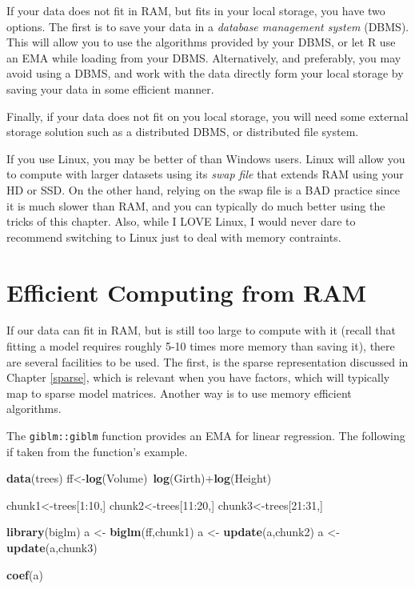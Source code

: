 \documentclass[]{book}
\newenvironment{Shaded}{\begin{snugshade}}{\end{snugshade}}
\newcommand{\KeywordTok}[1]{\textcolor[rgb]{0.13,0.29,0.53}{\textbf{{#1}}}}
\newcommand{\DecValTok}[1]{\textcolor[rgb]{0.00,0.00,0.81}{{#1}}}
\newcommand{\StringTok}[1]{\textcolor[rgb]{0.31,0.60,0.02}{{#1}}}
\newcommand{\NormalTok}[1]{{#1}}
\theoremstyle{definition}
\theoremstyle{definition}
\theoremstyle{remark}
\let\BeginKnitrBlock\begin \let\EndKnitrBlock\end
\begin{document}
If your data does not fit in RAM, but fits in your local storage, you
have two options. The first is to save your data in a \emph{database
management system} (DBMS). This will allow you to use the algorithms
provided by your DBMS, or let R use an EMA while loading from your DBMS.
Alternatively, and preferably, you may avoid using a DBMS, and work with
the data directly form your local storage by saving your data in some
efficient manner.

Finally, if your data does not fit on you local storage, you will need
some external storage solution such as a distributed DBMS, or
distributed file system.

\BeginKnitrBlock{remark}
If you use Linux, you may be better of than
Windows users. Linux will allow you to compute with larger datasets
using its \emph{swap file} that extends RAM using your HD or SSD. On the
other hand, relying on the swap file is a BAD practice since it is much
slower than RAM, and you can typically do much better using the tricks
of this chapter. Also, while I LOVE Linux, I would never dare to
recommend switching to Linux just to deal with memory contraints.
\EndKnitrBlock{remark}

\section{Efficient Computing from
RAM}\label{efficient-computing-from-ram}

If our data can fit in RAM, but is still too large to compute with it
(recall that fitting a model requires roughly 5-10 times more memory
than saving it), there are several facilities to be used. The first, is
the sparse representation discussed in Chapter \ref{sparse}, which is
relevant when you have factors, which will typically map to sparse model
matrices. Another way is to use memory efficient algorithms.

The \texttt{giblm::giblm} function provides an EMA for linear
regression. The following if taken from the function's example.

\begin{Shaded}
\begin{Highlighting}[]
\KeywordTok{data}\NormalTok{(trees)}
\NormalTok{ff<-}\KeywordTok{log}\NormalTok{(Volume)~}\KeywordTok{log}\NormalTok{(Girth)+}\KeywordTok{log}\NormalTok{(Height)}

\NormalTok{chunk1<-trees[}\DecValTok{1}\NormalTok{:}\DecValTok{10}\NormalTok{,]}
\NormalTok{chunk2<-trees[}\DecValTok{11}\NormalTok{:}\DecValTok{20}\NormalTok{,]}
\NormalTok{chunk3<-trees[}\DecValTok{21}\NormalTok{:}\DecValTok{31}\NormalTok{,]}

\KeywordTok{library}\NormalTok{(biglm)}
\NormalTok{a <-}\StringTok{ }\KeywordTok{biglm}\NormalTok{(ff,chunk1)}
\NormalTok{a <-}\StringTok{ }\KeywordTok{update}\NormalTok{(a,chunk2)}
\NormalTok{a <-}\StringTok{ }\KeywordTok{update}\NormalTok{(a,chunk3)}

\KeywordTok{coef}\NormalTok{(a)}
\end{Highlighting}
\end{Shaded}
\end{document}
